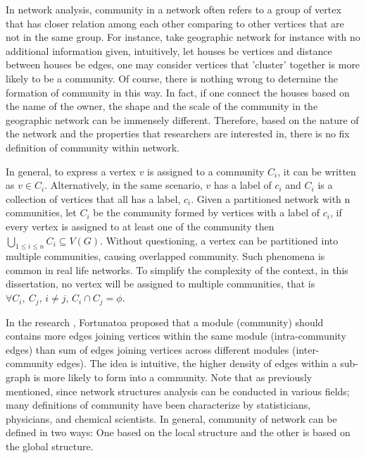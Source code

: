 \documentclass[12pt]{article}
\begin{document}

In network analysis, community in a network often refers to a group of vertex that has closer relation among each other comparing to other vertices that are not in the same group. For instance, take geographic network for instance with no additional information given, intuitively, let houses be vertices and distance between houses be edges, one may consider vertices that 'cluster' together is more likely to be a community. Of course, there is nothing wrong to determine the formation of community in this way. In fact, if one connect the houses based on the name of the owner, the shape and the scale of the community in the geographic network can be immensely different. Therefore, based on the nature of the network and the properties that researchers are interested in, there is no fix definition of community within network. 

\bigbreak

In general, to express a vertex $v$ is assigned to a community $C_i$, it can be written as $v \in C_i$. Alternatively, in the same scenario, $v$ has a label of $c_i$ and $C_i$ is a collection of vertices that all has a label, $c_i$. Given a partitioned network with n communities, let $C_i$ be the community formed by vertices with a label of $c_i$, if every vertex is assigned to at least one of the community then $\bigcup_{1 \leq i \leq n} C_i \subseteq V(G)$.  Without questioning, a vertex can be partitioned into multiple communities, causing overlapped community. Such phenomena is common in real life networks\cite{2,4,6}. To simplify the complexity of the context, in this dissertation, no vertex will be assigned to multiple communities, that is $\forall C_i,\ C_j \text{, } i \neq j\text{, }C_i \cap C_j = \phi$. 

\bigbreak

In the research \cite{19}, Fortunatoa proposed that a module (community) should contains more edges joining vertices within the same module (intra-community edges) than sum of edges joining vertices across different modules (inter-community edges). The idea is intuitive, the higher density of edges within a sub-graph is more likely to form into a community. Note that as previously mentioned, since network structures analysis can be conducted in various fields; many definitions of community have been characterize by statisticians, physicians, and chemical scientists. In general, community of network can be defined in two ways: One based on the local structure and the other is based on the global structure.
\end{document}
